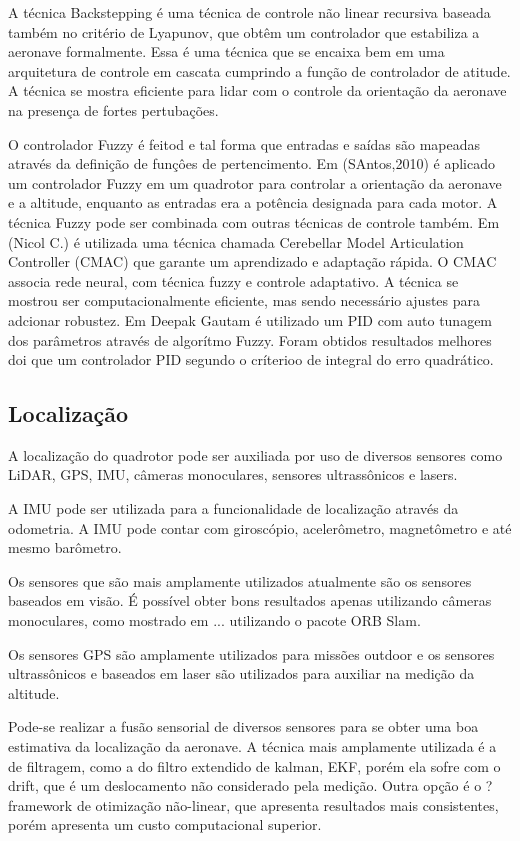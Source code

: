 A técnica Backstepping é uma técnica de controle não linear recursiva baseada também no critério de Lyapunov, que obtêm um controlador que estabiliza a aeronave formalmente. Essa é uma técnica que se encaixa bem em uma arquitetura de controle em cascata cumprindo a função de controlador de atitude. A técnica se mostra eficiente para lidar com o controle da orientação da aeronave na presença de fortes pertubações.

O controlador Fuzzy é feitod e tal forma que entradas e saídas são mapeadas através da definição de funçôes de pertencimento. Em (SAntos,2010) é aplicado um controlador Fuzzy em um quadrotor para controlar a orientação da aeronave e a altitude, enquanto as entradas era a potência designada para cada motor. A técnica Fuzzy pode ser combinada com outras técnicas de controle também. Em (Nicol C.) é utilizada uma técnica chamada Cerebellar Model Articulation Controller  (CMAC) que garante um aprendizado e adaptação rápida. O CMAC associa rede neural, com técnica fuzzy e controle adaptativo. A técnica se mostrou ser computacionalmente eficiente, mas sendo necessário ajustes para adcionar robustez. Em Deepak Gautam é utilizado um PID com auto tunagem dos parâmetros através de algorítmo Fuzzy. Foram obtidos resultados melhores doi que um controlador PID segundo o críterioo de integral do erro quadrático.


\subsection{Localização}
A localização do quadrotor pode ser auxiliada por uso de diversos sensores como LiDAR, GPS, IMU, câmeras monoculares, sensores ultrassônicos e lasers.

A IMU pode ser utilizada para a funcionalidade de localização através da odometria. A IMU pode contar com giroscópio, acelerômetro, magnetômetro e até mesmo barômetro.

Os sensores que são mais amplamente utilizados atualmente são os sensores baseados em visão. É possível obter bons resultados apenas utilizando câmeras monoculares, como mostrado em ... utilizando o pacote ORB Slam.

Os sensores GPS são amplamente utilizados para missões outdoor e os sensores ultrassônicos e baseados em laser são utilizados para auxiliar na medição da altitude.

Pode-se realizar a fusão sensorial de diversos sensores para se obter uma boa estimativa da localização da aeronave. A técnica mais amplamente utilizada é a de filtragem, como a do filtro extendido de kalman, EKF, porém ela sofre com o drift, que é um deslocamento não considerado pela medição. Outra opção é o ? framework de otimização não-linear, que apresenta resultados mais consistentes, porém apresenta um custo computacional superior.

